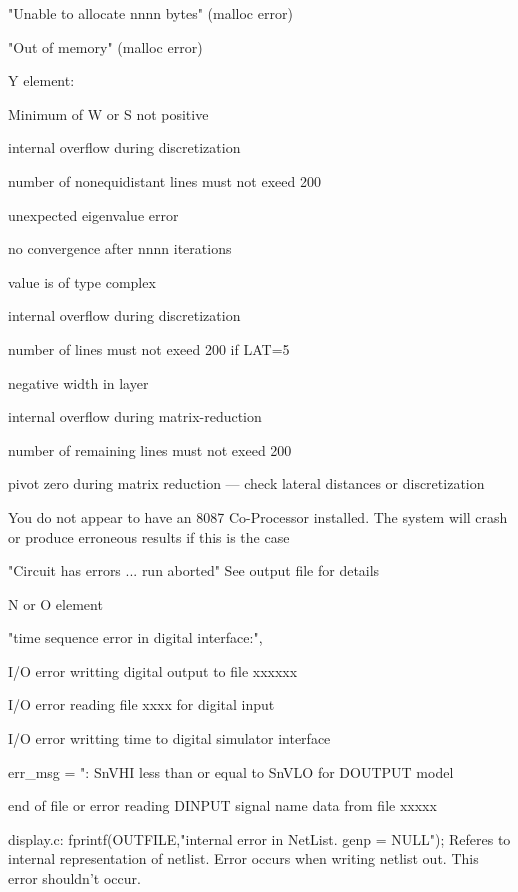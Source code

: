 "Unable to allocate nnnn bytes"
(malloc error)


"Out of memory"
(malloc error)








Y element:

Minimum of W or S not positive

internal overflow during discretization

number of nonequidistant lines must not exeed 200

unexpected eigenvalue error

no convergence after nnnn iterations

value is of type complex

internal overflow during discretization

number of lines must not exeed 200 if LAT=5

negative width in layer

internal overflow during matrix-reduction

number of remaining lines must not exeed 200

pivot zero during matrix reduction --- check lateral distances or discretization






You do not appear to have an 8087 Co-Processor installed.
The system will crash or produce erroneous results if this is the case





"Circuit has errors ... run aborted"
See output file for details





N or O element

"time sequence error in digital interface:",

I/O error writting digital output to file xxxxxx 

I/O error reading file xxxx for digital input

I/O error writting time to digital simulator interface

err_msg = "\nERROR: SnVHI less than or equal to SnVLO for DOUTPUT model %

end of file or error reading DINPUT signal name data from file xxxxx

display.c:	fprintf(OUTFILE,"internal error in NetList.  genp = NULL\n");
Referes to internal representation of netlist. Error occurs when writing
netlist out.  This error shouldn't occur.

